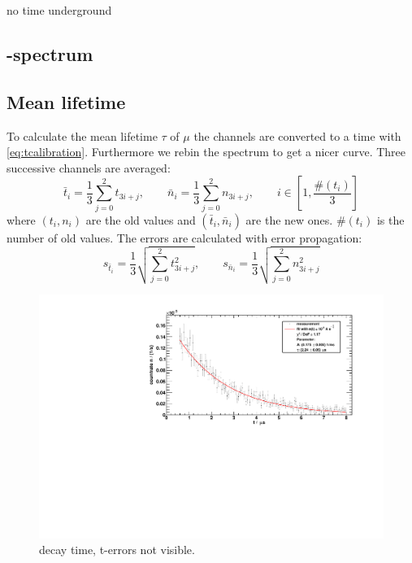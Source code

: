 no time underground

\subsection{\textbeta-spectrum}

\subsection{Mean lifetime}
To calculate the mean lifetime $\tau$ of $\mu$ the channels are converted to a time with \autoref{eq:tcalibration}. 
Furthermore we rebin the spectrum to get a nicer curve. Three successive channels are averaged:
\begin{equation}
    \bar{t}_i = \frac{1}{3} \sum_{j=0}^{2} t_{3i+j}, \qquad \bar{n}_i = \frac{1}{3} \sum_{j=0}^{2} n_{3i+j}, \qquad i \in \left[1, \frac{\#(t_i)}{3} \right]
\end{equation}
where $(t_i, n_i)$ are the old values and $(\bar{t}_i, \bar{n}_i)$ are the new ones. $\#(t_i)$ is the number of old values.
The errors are calculated with error propagation:
\begin{equation}
    s_{\bar{t}_i} = \frac{1}{3} \sqrt{\sum_{j=0}^{2} t_{3i+j}^2}, \qquad s_{\bar{n}_i} = \frac{1}{3} \sqrt{\sum_{j=0}^{2} n_{3i+j}^2}
\end{equation}
\begin{figure}[H]
\begin{center}
  \includegraphics[width=\textwidth]{../img/decayTime.pdf}
  \caption{decay time, t-errors not visible.}
  \label{img:decaytime}
\end{center}
\end{figure}

